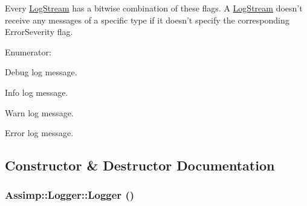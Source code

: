 Every \hyperlink{class_assimp_1_1_log_stream}{LogStream} has a bitwise combination of these flags. A \hyperlink{class_assimp_1_1_log_stream}{LogStream} doesn't receive any messages of a specific type if it doesn't specify the corresponding ErrorSeverity flag. \begin{Desc}
\item[Enumerator: ]\par
\begin{description}
\item[{\em 
\hypertarget{class_assimp_1_1_logger_cd0b52a87d6fc11e957ed2c6e2ad75b60cb475014d27098c3423738c571d857f}{
Debugging}
\label{class_assimp_1_1_logger_cd0b52a87d6fc11e957ed2c6e2ad75b60cb475014d27098c3423738c571d857f}
}]Debug log message. \item[{\em 
\hypertarget{class_assimp_1_1_logger_cd0b52a87d6fc11e957ed2c6e2ad75b6a3377a574928b86f7de55c5df154f461}{
Info}
\label{class_assimp_1_1_logger_cd0b52a87d6fc11e957ed2c6e2ad75b6a3377a574928b86f7de55c5df154f461}
}]Info log message. \item[{\em 
\hypertarget{class_assimp_1_1_logger_cd0b52a87d6fc11e957ed2c6e2ad75b61279c77aaee5a3d7df835a9b9305a697}{
Warn}
\label{class_assimp_1_1_logger_cd0b52a87d6fc11e957ed2c6e2ad75b61279c77aaee5a3d7df835a9b9305a697}
}]Warn log message. \item[{\em 
\hypertarget{class_assimp_1_1_logger_cd0b52a87d6fc11e957ed2c6e2ad75b671054d0b1323abcea46d050d69013d27}{
Err}
\label{class_assimp_1_1_logger_cd0b52a87d6fc11e957ed2c6e2ad75b671054d0b1323abcea46d050d69013d27}
}]Error log message. \end{description}
\end{Desc}



\subsection{Constructor \& Destructor Documentation}
\hypertarget{class_assimp_1_1_logger_784e6d1a741072b17bab32a6a41055e8}{
\subsubsection[Logger]{\setlength{\rightskip}{0pt plus 5cm}Assimp::Logger::Logger ()}}
\label{class_assimp_1_1_logger_784e6d1a741072b17bab32a6a41055e8}


